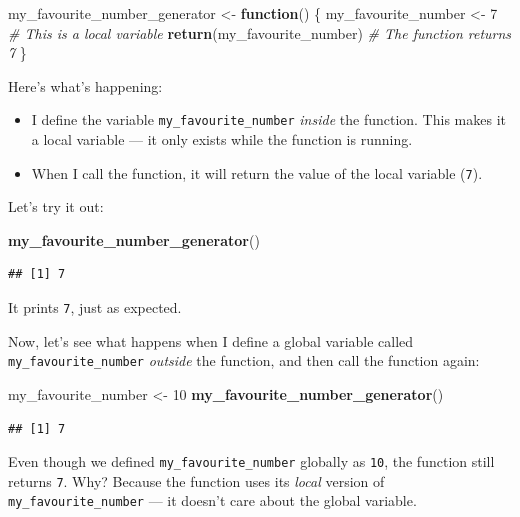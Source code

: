 \documentclass[
]{book}
\newenvironment{Shaded}{\begin{snugshade}}{\end{snugshade}}
\newcommand{\CommentTok}[1]{\textcolor[rgb]{0.56,0.35,0.01}{\textit{#1}}}
\newcommand{\ControlFlowTok}[1]{\textcolor[rgb]{0.13,0.29,0.53}{\textbf{#1}}}
\newcommand{\DecValTok}[1]{\textcolor[rgb]{0.00,0.00,0.81}{#1}}
\newcommand{\FunctionTok}[1]{\textcolor[rgb]{0.13,0.29,0.53}{\textbf{#1}}}
\newcommand{\NormalTok}[1]{#1}
\newcommand{\OtherTok}[1]{\textcolor[rgb]{0.56,0.35,0.01}{#1}}
\begin{document}
\begin{Shaded}
\begin{Highlighting}[]
\NormalTok{my\_favourite\_number\_generator }\OtherTok{\textless{}{-}} \ControlFlowTok{function}\NormalTok{() \{}
\NormalTok{  my\_favourite\_number }\OtherTok{\textless{}{-}} \DecValTok{7}  \CommentTok{\# This is a local variable}
  \FunctionTok{return}\NormalTok{(my\_favourite\_number)  }\CommentTok{\# The function returns 7}
\NormalTok{\}}
\end{Highlighting}
\end{Shaded}

Here's what's happening:

\begin{itemize}
\item
  I define the variable \texttt{my\_favourite\_number} \emph{inside} the function. This makes it a local variable --- it only exists while the function is running.
\item
  When I call the function, it will return the value of the local variable (\texttt{7}).
\end{itemize}

Let's try it out:

\begin{Shaded}
\begin{Highlighting}[]
\FunctionTok{my\_favourite\_number\_generator}\NormalTok{()}
\end{Highlighting}
\end{Shaded}

\begin{verbatim}
## [1] 7
\end{verbatim}

It prints \texttt{7}, just as expected.

Now, let's see what happens when I define a global variable called \texttt{my\_favourite\_number} \emph{outside} the function, and then call the function again:

\begin{Shaded}
\begin{Highlighting}[]
\NormalTok{my\_favourite\_number }\OtherTok{\textless{}{-}} \DecValTok{10}
\FunctionTok{my\_favourite\_number\_generator}\NormalTok{()}
\end{Highlighting}
\end{Shaded}

\begin{verbatim}
## [1] 7
\end{verbatim}

Even though we defined \texttt{my\_favourite\_number} globally as \texttt{10}, the function still returns \texttt{7}. Why? Because the function uses its \emph{local} version of \texttt{my\_favourite\_number} --- it doesn't care about the global variable.
\end{document}
